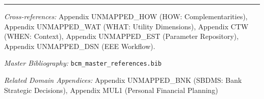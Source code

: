 
\vspace{1em}
\hrule
\vspace{0.5em}

\noindent\textit{Cross-references:}
Appendix UNMAPPED_HOW (HOW: Complementarities),
Appendix UNMAPPED_WAT (WHAT: Utility Dimensions),
Appendix CTW (WHEN: Context),
Appendix UNMAPPED_EST (Parameter Repository),
Appendix UNMAPPED_DSN (EEE Workflow).

\noindent\textit{Master Bibliography:} \texttt{bcm\_master\_references.bib}

\noindent\textit{Related Domain Appendices:} Appendix UNMAPPED_BNK (SBDMS: Bank Strategic Decisions), Appendix MUL1 (Personal Financial Planning)

